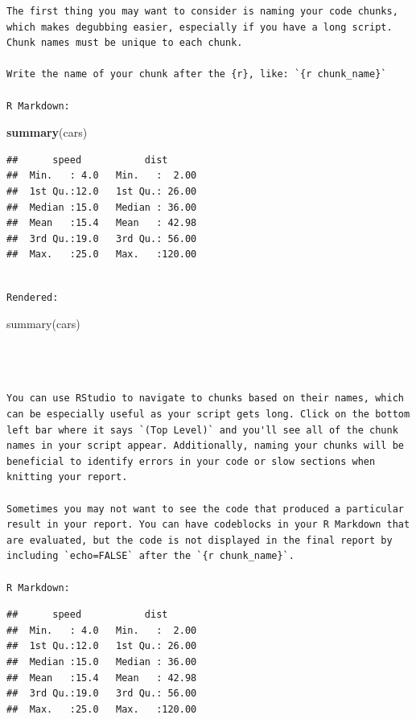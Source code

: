 \documentclass[
]{book}
\newenvironment{Shaded}{\begin{snugshade}}{\end{snugshade}}
\newcommand{\KeywordTok}[1]{\textcolor[rgb]{0.13,0.29,0.53}{\textbf{#1}}}
\newcommand{\NormalTok}[1]{#1}
\begin{document}
\begin{verbatim}
The first thing you may want to consider is naming your code chunks, which makes degubbing easier, especially if you have a long script. Chunk names must be unique to each chunk.

Write the name of your chunk after the {r}, like: `{r chunk_name}`

R Markdown:
\end{verbatim}

\begin{Shaded}
\begin{Highlighting}[]
\KeywordTok{summary}\NormalTok{(cars)}
\end{Highlighting}
\end{Shaded}

\begin{verbatim}
##      speed           dist       
##  Min.   : 4.0   Min.   :  2.00  
##  1st Qu.:12.0   1st Qu.: 26.00  
##  Median :15.0   Median : 36.00  
##  Mean   :15.4   Mean   : 42.98  
##  3rd Qu.:19.0   3rd Qu.: 56.00  
##  Max.   :25.0   Max.   :120.00
\end{verbatim}

\begin{verbatim}

Rendered:
\end{verbatim}

summary(cars)

\begin{verbatim}



You can use RStudio to navigate to chunks based on their names, which can be especially useful as your script gets long. Click on the bottom left bar where it says `(Top Level)` and you'll see all of the chunk names in your script appear. Additionally, naming your chunks will be beneficial to identify errors in your code or slow sections when knitting your report.

Sometimes you may not want to see the code that produced a particular result in your report. You can have codeblocks in your R Markdown that are evaluated, but the code is not displayed in the final report by including `echo=FALSE` after the `{r chunk_name}`.

R Markdown:
\end{verbatim}

\begin{verbatim}
##      speed           dist       
##  Min.   : 4.0   Min.   :  2.00  
##  1st Qu.:12.0   1st Qu.: 26.00  
##  Median :15.0   Median : 36.00  
##  Mean   :15.4   Mean   : 42.98  
##  3rd Qu.:19.0   3rd Qu.: 56.00  
##  Max.   :25.0   Max.   :120.00
\end{verbatim}
\end{document}
